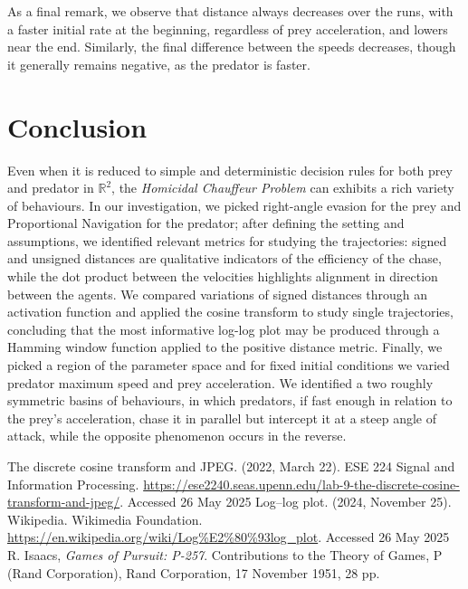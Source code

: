 \documentclass[11pt, twocolumn]{article}
\begin{document}
          As a final remark, we observe that distance always decreases over the runs, with a faster initial rate at the beginning, regardless of prey acceleration, and lowers near the end. Similarly, the final difference between the speeds decreases, though it generally remains negative, as the predator is faster.

          \section{Conclusion}
          Even when it is reduced to simple and deterministic decision rules for both prey and predator in $\mathbb{R}^2$, the \textit{Homicidal Chauffeur Problem} can exhibits a rich variety of behaviours. In our investigation, we picked right-angle evasion for the prey and Proportional Navigation for the predator; after defining the setting and assumptions, we identified relevant metrics for studying the trajectories: signed and unsigned distances are qualitative indicators of the efficiency of the chase, while the dot product between the velocities highlights alignment in direction between the agents. We compared variations of signed distances through an activation function and applied the cosine transform to study single trajectories, concluding that the most informative log-log plot may be produced through a Hamming window function applied to the positive distance metric. Finally, we picked a region of the parameter space and for fixed initial conditions we varied predator maximum speed and prey acceleration. We identified a two roughly symmetric basins of behaviours, in which predators, if fast enough in relation to the prey's acceleration, chase it in parallel but intercept it at a steep angle of attack, while the opposite phenomenon occurs in the reverse.

          \begin{thebibliography}{99}
             The discrete cosine transform and JPEG. (2022, March 22). ESE 224 Signal and Information Processing. \url{https://ese2240.seas.upenn.edu/lab-9-the-discrete-cosine-transform-and-jpeg/}. Accessed 26 May 2025
             Log–log plot. (2024, November 25). Wikipedia. Wikimedia Foundation. \url{https://en.wikipedia.org/wiki/Log%E2%80%93log_plot}. Accessed 26 May 2025
               R. Isaacs, \emph{Games of Pursuit: P-257}. Contributions to the Theory of Games, P (Rand Corporation), Rand Corporation, 17 November 1951, 28 pp.
            \end{thebibliography}
            
\end{document}
